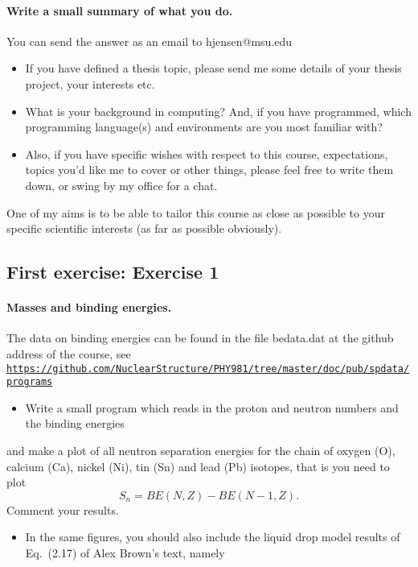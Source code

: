 \documentclass[%
twoside,                 %
final,                   %
10pt]{article}
\begin{document}
\paragraph{Write a small summary of what you do.}
You can send the answer as an email to hjensen@msu.edu
\begin{itemize}
\item If you have defined a thesis topic, please send me some details of your thesis project, your interests etc.

\item What is your background in computing? And, if you have programmed, which programming language(s) and environments  are you  most familiar with?  

\item Also, if you have specific wishes with respect to this course, expectations, topics you'd like me to cover or other things, please feel free to write them down, or swing by my office for a chat. 
\end{itemize}

\noindent
One of my aims is to be able to tailor this course as close as possible to your specific scientific interests (as far as possible obviously).



\subsection*{First exercise: Exercise 1}

\paragraph{Masses and binding energies.}
The data on binding energies can be found in the file bedata.dat at the github address of the course, see
\href{{https://github.com/NuclearStructure/PHY981/tree/master/doc/pub/spdata/programs}}{\nolinkurl{https://github.com/NuclearStructure/PHY981/tree/master/doc/pub/spdata/programs}}

\begin{itemize}
  \item Write a small program which reads in the proton and neutron numbers and the binding energies 
\end{itemize}

\noindent
and make a plot of all neutron separation energies for the chain of oxygen (O), calcium (Ca), nickel (Ni), tin (Sn) and lead (Pb) isotopes, that is you need to plot
\[
S_n= BE(N,Z)-BE(N-1,Z).
\]
Comment your results. 
\begin{itemize}
 \item In the same figures, you should also include the liquid drop model results of Eq.~(2.17) of Alex Brown's text, namely
\end{itemize}
\end{document}
